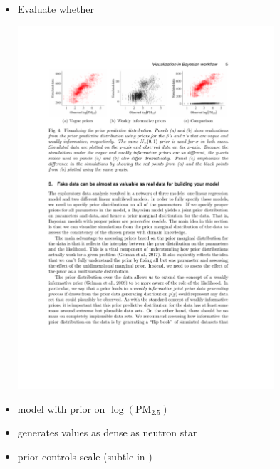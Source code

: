 \documentclass[10pt]{report}
\begin{document}

\begin{itemize}
\item Evaluate whether 
\begin{center}
\includegraphics[width=0.75\textwidth]{img/prior-predictive-eg.pdf}
\end{center}
\vspace*{-10pt}
\item {} model with prior on
  $\log(\textrm{PM}_{2.5})$
\item {} generates values as dense as neutron star
\item {} prior controls scale (subtle in )
\end{itemize}
\end{document}
